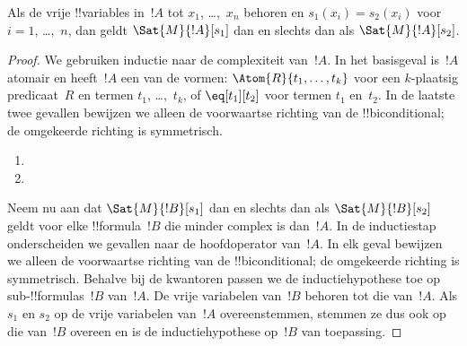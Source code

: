 \documentclass[openany]{memoir}
\begin{document}
\begin{prop}
Als de vrije !!{variable}s in~$!A$ tot $x_1$, \dots,~$x_n$ behoren
en $s_1(x_i) = s_2(x_i)$ voor $i = 1$, \dots,~$n$, dan geldt
$\Sat{M}{!A}[s_1]$ dan en slechts dan als $\Sat{M}{!A}[s_2]$.
\end{prop}

\begin{proof}
We gebruiken inductie naar de complexiteit van~$!A$. In het
basisgeval is~$!A$ atomair en heeft~$!A$ een van de vormen:
$\Atom{R}{t_1, \dots, t_k}$ voor een $k$-plaatsig predicaat~$R$ en
termen $t_1$, \dots,~$t_k$, of $\eq[t_1][t_2]$ voor termen $t_1$
en~$t_2$. In de laatste twee gevallen bewijzen we alleen de voorwaartse
richting van de !!{biconditional}; de omgekeerde richting is
symmetrisch.

\begin{enumerate}


\item
\item
\end{enumerate}

Neem nu aan dat $\Sat{M}{!B}[s_1]$ dan en slechts dan als
$\Sat{M}{!B}[s_2]$ geldt voor elke !!{formula}~$!B$ die minder complex
is dan~$!A$. In de inductiestap onderscheiden we gevallen naar de
hoofdoperator van~$!A$. In elk geval bewijzen we alleen de
voorwaartse richting van de !!{biconditional}; de omgekeerde richting
is symmetrisch. Behalve bij de kwantoren passen we de
inductiehypothese toe op sub-!!{formula}s~$!B$ van~$!A$. De vrije
variabelen van~$!B$ behoren tot die van~$!A$. Als $s_1$ en $s_2$ op de
vrije variabelen van~$!A$ overeenstemmen, stemmen ze dus ook op die
van~$!B$ overeen en is de inductiehypothese op~$!B$ van toepassing.


\end{proof}
\end{document}
